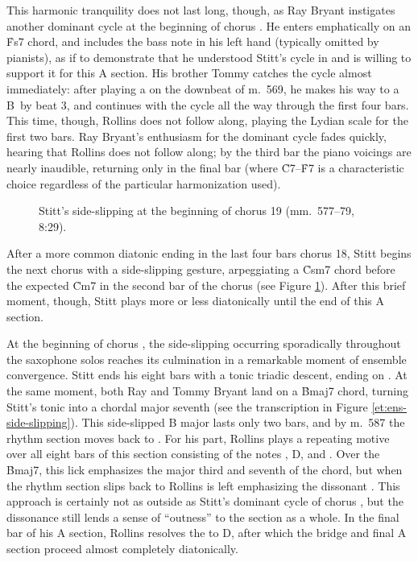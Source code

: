 This harmonic tranquility does not last long, though, as Ray Bryant instigates
another dominant cycle at the beginning of chorus . He enters
emphatically on an \h{Fs7} chord, and includes the bass note in his left hand
(typically omitted by pianists), as if to demonstrate that he understood
Stitt's cycle in  and is willing to support it for this A section.
His brother Tommy catches the cycle almost immediately: after playing a \Bflat
on the downbeat of m.~569, he makes his way to a B\nat\ by beat 3, and
continues with the cycle all the way through the first four bars. This time,
though, Rollins does not follow along, playing the \Bflat Lydian scale
for the first two bars. Ray Bryant's enthusiasm for the dominant cycle fades
quickly, hearing that Rollins does not follow along; by the third bar the
piano voicings are nearly inaudible, returning only in the final bar (where
\h{C7}--\h{F7} is a characteristic choice regardless of the particular
harmonization used).

\begin{figure}[tbp]
  \caption[Stitt's side-slipping at the beginning of chorus 19.]{%
    Stitt's side-slipping at the beginning of chorus 19 (mm.~577--79, 8:29).}
  \label{et:ss-side-slipping}
\end{figure}

After a more common diatonic ending in the last four bars chorus 18, Stitt
begins the next chorus with a side-slipping gesture, arpeggiating a \h{Csm7}
chord before the expected \h{Cm7} in the second bar of the chorus (see Figure
\ref{et:ss-side-slipping}). After this brief moment, though, Stitt plays more
or less diatonically until the end of this A section.

At the beginning of chorus , the side-slipping occurring
sporadically throughout the saxophone solos reaches its culmination in a
remarkable moment of ensemble convergence. Stitt ends his eight bars with a
tonic triadic descent, ending on \Bflat. At the same moment, both Ray and
Tommy Bryant land on a \h{Bmaj7} chord, turning Stitt's tonic \Bflat into a
chordal major seventh (see the transcription in Figure
\ref{et:ens-side-slipping}). This side-slipped B major lasts only
two bars, and by m.~587 the rhythm section moves back to \Bflat. For his part,
Rollins plays a repeating motive over all eight bars of this section
consisting of the notes \Eflat, D, and \Bflat. Over the \h{Bmaj7}, this lick
emphasizes the major third and seventh of the chord, but when the rhythm
section slips back to \Bflat Rollins is left emphasizing the dissonant .
This approach is certainly not as outside as Stitt's dominant cycle of chorus
, but the dissonance still lends a sense of ``outness'' to the
section as a whole. In the final bar of his A section, Rollins resolves the
\Eflat to D, after which the bridge and final A section proceed almost
completely diatonically.

